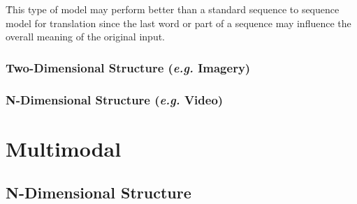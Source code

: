 \r{This type of model may perform better than a standard sequence to sequence model for translation since the last word or part of a sequence may influence the overall meaning of the original input.}



\subsubsection{Two-Dimensional Structure (\textit{e.g.} Imagery)}


\subsubsection{N-Dimensional Structure (\textit{e.g.} Video)}


\section{Multimodal}


\subsection{N-Dimensional Structure}